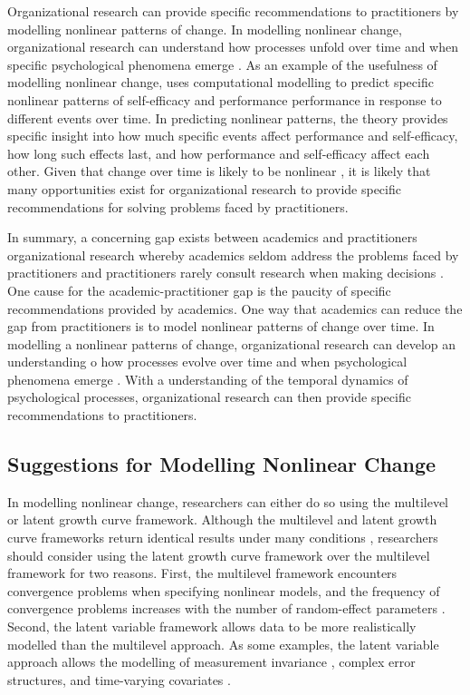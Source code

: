\documentclass[
12pt, %
twoside,
english]{guelphthesis}
\begin{document}
Organizational research can provide specific recommendations to practitioners by modelling nonlinear patterns of change. In modelling nonlinear change, organizational research can understand how processes unfold over time and when specific psychological phenomena emerge \autocite{mitchell2001,navarro2020}. As an example of the usefulness of modelling nonlinear change, \textcite{vancouver2020} uses computational modelling to predict specific nonlinear patterns of self-efficacy and performance performance in response to different events over time. In predicting nonlinear patterns, the theory provides specific insight into how much specific events affect performance and self-efficacy, how long such effects last, and how performance and self-efficacy affect each other. Given that change over time is likely to be nonlinear \autocite{cudeck2007}, it is likely that many opportunities exist for organizational research to provide specific recommendations for solving problems faced by practitioners.

In summary, a concerning gap exists between academics and practitioners organizational research whereby academics seldom address the problems faced by practitioners \autocite[e.g.,][]{sackett1990} and practitioners rarely consult research when making decisions \autocite{rynes2002b}. One cause for the academic-practitioner gap is the paucity of specific recommendations provided by academics. One way that academics can reduce the gap from practitioners is to model nonlinear patterns of change over time. In modelling a nonlinear patterns of change, organizational research can develop an understanding o how processes evolve over time and when psychological phenomena emerge \autocite{mitchell2001,navarro2020}. With a understanding of the temporal dynamics of psychological processes, organizational research can then provide specific recommendations to practitioners.

\hypertarget{suggestions-for-modelling-nonlinear-change}{%
\subsection{Suggestions for Modelling Nonlinear Change}\label{suggestions-for-modelling-nonlinear-change}}

In modelling nonlinear change, researchers can either do so using the multilevel or latent growth curve framework. Although the multilevel and latent growth curve frameworks return identical results under many conditions \autocite[e.g.,][]{bauer2003}, researchers should consider using the latent growth curve framework over the multilevel framework for two reasons. First, the multilevel framework encounters convergence problems when specifying nonlinear models, and the frequency of convergence problems increases with the number of random-effect parameters \autocite[for a review, see][]{mcneish2020}. Second, the latent variable framework allows data to be more realistically modelled than the multilevel approach. As some examples, the latent variable approach allows the modelling of measurement invariance \autocite{sayer2001,hancock2001}, complex error structures, and time-varying covariates \autocite[for a review, see][]{mcneish2018}.
\end{document}
